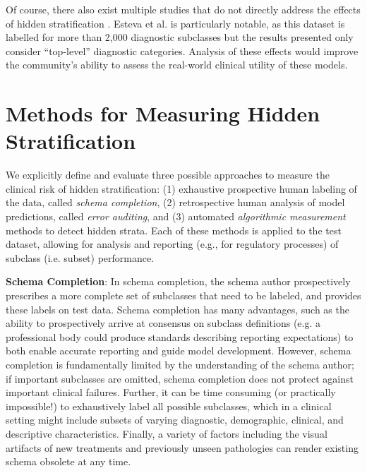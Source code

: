 \documentclass[sigconf]{acmart}
\begin{document}
 Of course, there also exist multiple studies that do not directly address the effects of hidden stratification \citep{Haenssle2018-vw, Bien2018-ae}. 
 Esteva et al. \citep{Esteva2017-if} is particularly notable, as this dataset is labelled for more than 2,000 diagnostic subclasses but the results presented only consider ``top-level'' diagnostic categories. 
 Analysis of these effects would improve the community's ability to assess the real-world clinical utility of these models. 

\section{Methods for Measuring Hidden Stratification}
\label{sec:methods}
We explicitly define and evaluate three possible approaches to measure the clinical risk of hidden stratification: (1) exhaustive prospective human labeling of the data, called \textit{schema completion}, (2) retrospective human analysis of model predictions, called \textit{error auditing}, and (3) automated \textit{algorithmic measurement} methods to detect hidden strata.  
Each of these methods is applied to the test dataset, allowing for analysis and reporting (e.g., for regulatory processes) of subclass (i.e. subset) performance.

\textbf{Schema Completion}: In schema completion, the schema author prospectively prescribes a more complete set of subclasses that need to be labeled, and provides these labels on test data. 
Schema completion has many advantages, such as the ability to prospectively arrive at consensus on subclass definitions (e.g. a professional body could produce standards describing reporting expectations) to both enable accurate reporting and guide model development.
However, schema completion is fundamentally limited by the understanding of the schema author; if important subclasses are omitted, schema completion does not protect against important clinical failures.
Further, it can be time consuming (or practically impossible!) to exhaustively label all possible subclasses, which in a clinical setting might include subsets of varying diagnostic, demographic, clinical, and descriptive characteristics.
Finally, a variety of factors including the visual artifacts of new treatments and previously unseen pathologies can render existing schema obsolete at any time.
\end{document}
